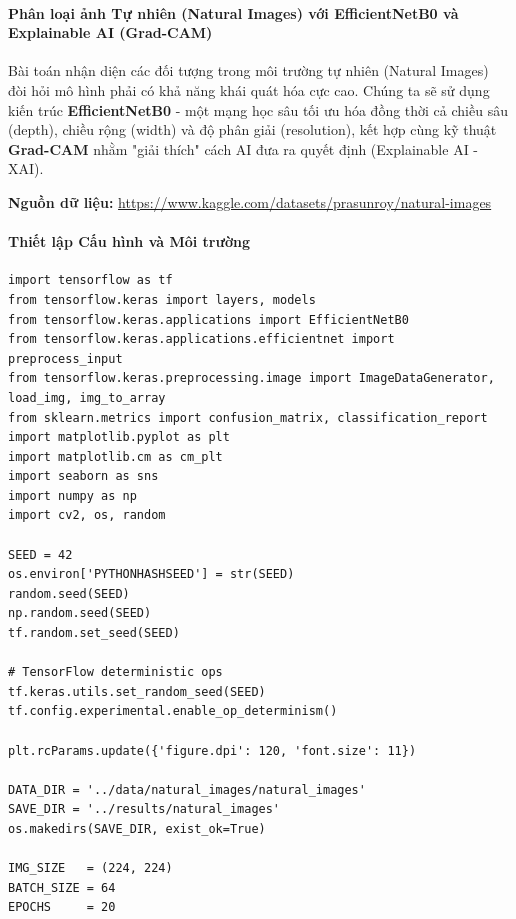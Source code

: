 \paragraph{Phân loại ảnh Tự nhiên (Natural Images) với EfficientNetB0 và Explainable AI (Grad-CAM)} \hfill\mbox{}

Bài toán nhận diện các đối tượng trong môi trường tự nhiên (Natural Images) đòi hỏi mô hình phải có khả năng khái quát hóa cực cao. Chúng ta sẽ sử dụng kiến trúc \textbf{EfficientNetB0} - một mạng học sâu tối ưu hóa đồng thời cả chiều sâu (depth), chiều rộng (width) và độ phân giải (resolution), kết hợp cùng kỹ thuật \textbf{Grad-CAM} nhằm "giải thích" cách AI đưa ra quyết định (Explainable AI - XAI).

\begin{center}
    \textbf{Nguồn dữ liệu:} \url{https://www.kaggle.com/datasets/prasunroy/natural-images}
\end{center}

\paragraph{Thiết lập Cấu hình và Môi trường} \hfill\mbox{}

\begin{lstlisting}[style=pythoncode, caption={Khởi tạo môi trường, seed và thư viện}]
import tensorflow as tf
from tensorflow.keras import layers, models
from tensorflow.keras.applications import EfficientNetB0
from tensorflow.keras.applications.efficientnet import preprocess_input
from tensorflow.keras.preprocessing.image import ImageDataGenerator, load_img, img_to_array
from sklearn.metrics import confusion_matrix, classification_report
import matplotlib.pyplot as plt
import matplotlib.cm as cm_plt
import seaborn as sns
import numpy as np
import cv2, os, random

SEED = 42
os.environ['PYTHONHASHSEED'] = str(SEED)
random.seed(SEED)
np.random.seed(SEED)
tf.random.set_seed(SEED)

# TensorFlow deterministic ops
tf.keras.utils.set_random_seed(SEED)
tf.config.experimental.enable_op_determinism()

plt.rcParams.update({'figure.dpi': 120, 'font.size': 11})

DATA_DIR = '../data/natural_images/natural_images'
SAVE_DIR = '../results/natural_images'
os.makedirs(SAVE_DIR, exist_ok=True)

IMG_SIZE   = (224, 224)
BATCH_SIZE = 64
EPOCHS     = 20
\end{lstlisting}

